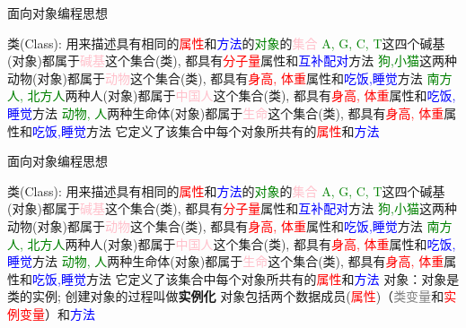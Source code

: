 \begin{frame}{面向对象编程思想}
    \small
    \begin{myoutline}
        \1 类(Class):
            \2 用来描述具有相同的\textcolor{red}{属性}和\textcolor{blue}{方法}的\textcolor{green}{对象}的\textcolor{pink}{集合}
                    \3 \textcolor{green}{A, G, C, T}这四个碱基(对象)都属于\textcolor{pink}{碱基}这个集合(类), 都具有\textcolor{red}{分子量}属性和\textcolor{blue}{互补配对}方法
                    \3 \textcolor{green}{狗,小猫}这两种动物(对象)都属于\textcolor{pink}{动物}这个集合(类), 都具有\textcolor{red}{身高, 体重}属性和\textcolor{blue}{吃饭,睡觉}方法
                    \3 \textcolor{green}{南方人,  北方人}两种人(对象)都属于\textcolor{pink}{中国人}这个集合(类), 都具有\textcolor{red}{身高, 体重}属性和\textcolor{blue}{吃饭,睡觉}方法
                    \3 \textcolor{green}{动物, 人}两种生命体(对象)都属于\textcolor{pink}{生命}这个集合(类), 都具有\textcolor{red}{身高, 体重}属性和\textcolor{blue}{吃饭,睡觉}方法
            \2 它定义了该集合中每个对象所共有的\textcolor{red}{属性}和\textcolor{blue}{方法}
    \end{myoutline}
\end{frame}

\begin{frame}{面向对象编程思想}
    \small
    \begin{myoutline}
        \1 类(Class):
            \2 用来描述具有相同的\textcolor{red}{属性}和\textcolor{blue}{方法}的\textcolor{green}{对象}的\textcolor{pink}{集合}
                    \3 \textcolor{green}{A, G, C, T}这四个碱基(对象)都属于\textcolor{pink}{碱基}这个集合(类), 都具有\textcolor{red}{分子量}属性和\textcolor{blue}{互补配对}方法
                    \3 \textcolor{green}{狗,小猫}这两种动物(对象)都属于\textcolor{pink}{动物}这个集合(类), 都具有\textcolor{red}{身高, 体重}属性和\textcolor{blue}{吃饭,睡觉}方法
                    \3 \textcolor{green}{南方人,  北方人}两种人(对象)都属于\textcolor{pink}{中国人}这个集合(类), 都具有\textcolor{red}{身高, 体重}属性和\textcolor{blue}{吃饭,睡觉}方法
                    \3 \textcolor{green}{动物, 人}两种生命体(对象)都属于\textcolor{pink}{生命}这个集合(类), 都具有\textcolor{red}{身高, 体重}属性和\textcolor{blue}{吃饭,睡觉}方法
            \2 它定义了该集合中每个对象所共有的\textcolor{red}{属性}和\textcolor{blue}{方法}
        \1 对象：对象是类的实例; 创建对象的过程叫做\textbf{实例化}
            \2 对象包括两个数据成员(\textcolor{red}{属性})（\textcolor{gray}{类变量}和\textcolor{red}{实例变量}）和\textcolor{blue}{方法}
    \end{myoutline}
\end{frame}

